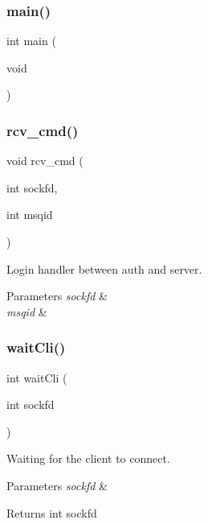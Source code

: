 \subsubsection{main()}
{\footnotesize\ttfamily int main (\begin{DoxyParamCaption}\item[{void}]{ }\end{DoxyParamCaption})}

\mbox{\label{server_8c_abccdfc478d69333f46803552eba43cbb}} 
\subsubsection{rcv\+\_\+cmd()}
{\footnotesize\ttfamily void rcv\+\_\+cmd (\begin{DoxyParamCaption}\item[{int}]{sockfd,  }\item[{int}]{msqid }\end{DoxyParamCaption})}



Login handler between auth and server. 


\begin{DoxyParams}{Parameters}
{\em sockfd} & \\
\hline
{\em msqid} & \\
\hline
\end{DoxyParams}
\mbox{\label{server_8c_a3ce2890f28931d91797e27834f0a1bfa}} 
\subsubsection{wait\+Cli()}
{\footnotesize\ttfamily int wait\+Cli (\begin{DoxyParamCaption}\item[{int}]{sockfd }\end{DoxyParamCaption})}



Waiting for the client to connect. 


\begin{DoxyParams}{Parameters}
{\em sockfd} & \\
\hline
\end{DoxyParams}
\begin{DoxyReturn}{Returns}
int sockfd 
\end{DoxyReturn}
